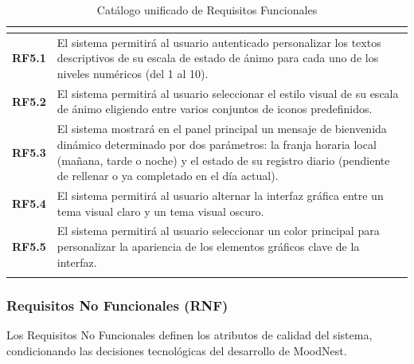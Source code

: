 \begin{xltabular}{\textwidth}{|>{\bfseries}c|X|}
     \\ \hline
    RF5.1 & El sistema permitirá al usuario autenticado personalizar los textos descriptivos de su escala de estado de ánimo para cada uno de los niveles numéricos (del 1 al 10). \\ \hline
    RF5.2 & El sistema permitirá al usuario seleccionar el estilo visual de su escala de ánimo eligiendo entre varios conjuntos de iconos predefinidos. \\ \hline
    RF5.3 & El sistema mostrará en el panel principal un mensaje de bienvenida dinámico determinado por dos parámetros: la franja horaria local (mañana, tarde o noche) y el estado de su registro diario (pendiente de rellenar o ya completado en el día actual). \\ \hline
    RF5.4 & El sistema permitirá al usuario alternar la interfaz gráfica entre un tema visual claro y un tema visual oscuro. \\ \hline
    RF5.5 & El sistema permitirá al usuario seleccionar un color principal para personalizar la apariencia de los elementos gráficos clave de la interfaz. \\ \hline
    \caption{Catálogo unificado de Requisitos Funcionales} \label{tab:rf_total} \\

\end{xltabular}


\subsubsection{Requisitos No Funcionales (RNF)}

Los Requisitos No Funcionales definen los atributos de calidad del sistema, condicionando las decisiones tecnológicas del desarrollo de MoodNest.

